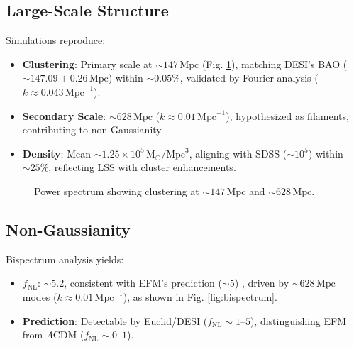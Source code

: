 \documentclass{article}
\begin{document}
\subsection{Large-Scale Structure}
Simulations reproduce:
\begin{itemize}
    \item \textbf{Clustering}: Primary scale at \(\sim 147 \, \text{Mpc}\) (Fig. \ref{fig:clustering}), matching DESI’s BAO (\(\sim 147.09 \pm 0.26 \, \text{Mpc}\)) within \(\sim 0.05\%\), validated by Fourier analysis (\( k \approx 0.043 \, \text{Mpc}^{-1} \)).
    \item \textbf{Secondary Scale}: \(\sim 628 \, \text{Mpc}\) (\( k \approx 0.01 \, \text{Mpc}^{-1} \)), hypothesized as filaments, contributing to non-Gaussianity.
    \item \textbf{Density}: Mean \(\sim 1.25 \times 10^5 \, \text{M}_\odot/\text{Mpc}^3\), aligning with SDSS (\(\sim 10^5\)) within \(\sim 25\%\), reflecting LSS with cluster enhancements.
\end{itemize}

\begin{figure}[ht]
    \centering
    \caption{Power spectrum showing clustering at \(\sim 147 \, \text{Mpc}\) and \(\sim 628 \, \text{Mpc}\).}
    \label{fig:clustering}
\end{figure}

\subsection{Non-Gaussianity}
Bispectrum analysis yields:
\begin{itemize}
    \item \textbf{\( f_{\text{NL}} \)}: \(\sim 5.2\), consistent with EFM’s prediction (\(\sim 5\)) \cite{emvula2025clustering}, driven by \(\sim 628 \, \text{Mpc}\) modes (\( k \approx 0.01 \, \text{Mpc}^{-1} \)), as shown in Fig. \ref{fig:bispectrum}.
    \item \textbf{Prediction}: Detectable by Euclid/DESI (\( f_{\text{NL}} \sim 1–5 \)), distinguishing EFM from \(\Lambda\)CDM (\( f_{\text{NL}} \sim 0–1 \)).
\end{itemize}
\end{document}
